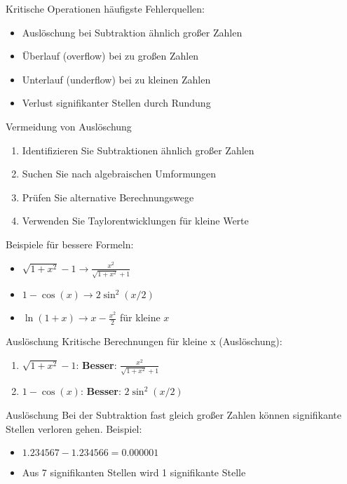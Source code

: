 \begin{concept}{Kritische Operationen} häufigste Fehlerquellen:
\begin{itemize}
    \item Auslöschung bei Subtraktion ähnlich großer Zahlen
    \item Überlauf (overflow) bei zu großen Zahlen
    \item Unterlauf (underflow) bei zu kleinen Zahlen
    \item Verlust signifikanter Stellen durch Rundung
\end{itemize}
\end{concept}

\begin{KR}{Vermeidung von Auslöschung}
\begin{enumerate}
    \item Identifizieren Sie Subtraktionen ähnlich großer Zahlen
    \item Suchen Sie nach algebraischen Umformungen
    \item Prüfen Sie alternative Berechnungswege
    \item Verwenden Sie Taylorentwicklungen für kleine Werte
\end{enumerate}

Beispiele für bessere Formeln:
    \begin{itemize}
        \item $\sqrt{1+x^2}-1 \rightarrow \frac{x^2}{\sqrt{1+x^2}+1}$
        \item $1-\cos(x) \rightarrow 2\sin^2(x/2)$
        \item $\ln(1+x) \rightarrow x-\frac{x^2}{2}$ für kleine $x$
    \end{itemize}
\end{KR}

\begin{example2}{Auslöschung} Kritische Berechnungen für kleine x (Auslöschung):
\begin{enumerate}
    \item $\sqrt{1 + x^2} - 1$: \textbf{Besser}: $\frac{x^2}{\sqrt{1 + x^2} + 1}$
    \item $1 - \cos(x)$: \textbf{Besser}: $2\sin^2(x/2)$
\end{enumerate}
\end{example2}

\begin{remark2}{Auslöschung}
    Bei der Subtraktion fast gleich großer Zahlen können signifikante Stellen verloren gehen. Beispiel:
    \begin{itemize}
        \item $1.234567 - 1.234566 = 0.000001$
        \item Aus 7 signifikanten Stellen wird 1 signifikante Stelle
    \end{itemize}
\end{remark2}


